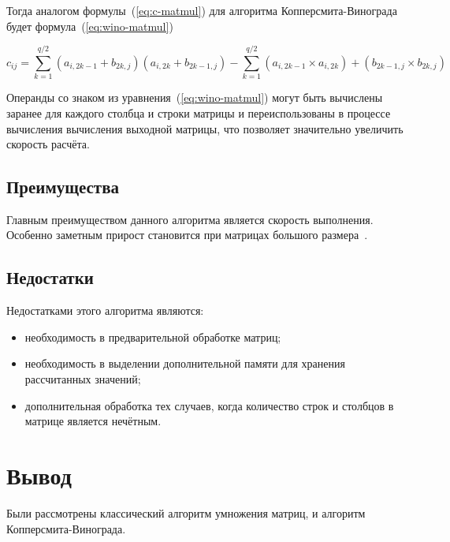 Тогда аналогом формулы~(\ref{eq:c-matmul}) для алгоритма Копперсмита-Винограда будет формула~(\ref{eq:wino-matmul})

\begin{equation}
    \label{eq:wino-matmul}
    c_{ij} = \sum\limits_{ k=1}^{ q/2}{(a_{i,2k-1} + b_{2k,j})(a_{i,2k} + b_{2k-1, j})} - \sum\limits_{ k=1}^{ q/2}{(a_{i, 2k-1}\times a_{i,2k}) + (b_{2k-1,j} \times b_{2k, j})}  
\end{equation}

Операнды со знаком из уравнения~(\ref{eq:wino-matmul}) могут быть вычислены заранее для каждого столбца и строки матрицы и переиспользованы в процессе вычисления вычисления выходной матрицы, что позволяет значительно увеличить скорость расчёта.

\subsection{Преимущества}

Главным преимуществом данного алгоритма является скорость выполнения. Особенно заметным прирост становится при матрицах большого размера~\cite{Winograd}.

\subsection{Недостатки}

Недостатками этого алгоритма являются:
\begin{itemize}
    \item необходимость в предварительной обработке матриц;
    \item необходимость в выделении дополнительной памяти для хранения рассчитанных значений;
    \item дополнительная обработка тех случаев, когда количество строк и столбцов в матрице является нечётным. 
\end{itemize}

\section{Вывод}

Были рассмотрены классический алгоритм умножения матриц, и алгоритм \\Копперсмита-Винограда.
